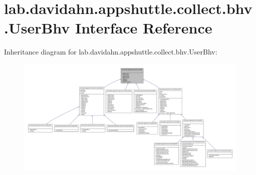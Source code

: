 \hypertarget{interfacelab_1_1davidahn_1_1appshuttle_1_1collect_1_1bhv_1_1_user_bhv}{\section{lab.\-davidahn.\-appshuttle.\-collect.\-bhv.\-User\-Bhv \-Interface \-Reference}
\label{interfacelab_1_1davidahn_1_1appshuttle_1_1collect_1_1bhv_1_1_user_bhv}
}


\-Inheritance diagram for lab.\-davidahn.\-appshuttle.\-collect.\-bhv.\-User\-Bhv\-:
\nopagebreak
\begin{figure}[H]
\begin{center}
\leavevmode
\includegraphics[width=350pt]{interfacelab_1_1davidahn_1_1appshuttle_1_1collect_1_1bhv_1_1_user_bhv__inherit__graph}
\end{center}
\end{figure}
